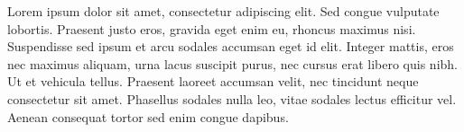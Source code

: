 %
%
%
%

Lorem ipsum dolor sit amet, consectetur adipiscing elit. Sed congue vulputate lobortis. Praesent justo eros, gravida eget enim eu, rhoncus maximus nisi. Suspendisse sed ipsum et arcu sodales accumsan eget id elit. Integer mattis, eros nec maximus aliquam, urna lacus suscipit purus, nec cursus erat libero quis nibh. Ut et vehicula tellus. Praesent laoreet accumsan velit, nec tincidunt neque consectetur sit amet. Phasellus sodales nulla leo, vitae sodales lectus efficitur vel. Aenean consequat tortor sed enim congue dapibus.

